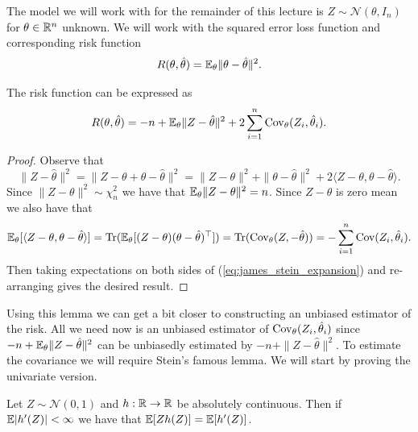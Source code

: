\medskip \noindent 
The model we will work with for the remainder of this lecture is $Z \sim \mathcal{N}(\theta, I_n)$ for $\theta \in \mathbb{R}^n$ unknown. We will work with the squared error loss function and corresponding risk function \[
	R(\theta, \hat \theta) = \mathbb{E}_{\theta} \|\theta - \hat \theta\|^2.
\]

\begin{lemma}
	The risk function can be expressed as \[
		R(\theta, \hat \theta) = -n + \mathbb{E}_\theta \|Z - \hat \theta\|^2 + 2 \sum_{i=1}^n \operatorname{Cov}_\theta(Z_i, \hat \theta_i).
	\]
\end{lemma}

\begin{proof}
Observe that \begin{equation}
	\|Z - \hat \theta\|^2 = \|Z - \theta + \theta - \hat \theta\|^2 = \|Z - \theta\|^2 + \|\theta - \hat \theta\|^2 + 2 \langle Z - \theta, \theta - \hat \theta \rangle. \label{eq:james_stein_expansion}
\end{equation} Since $\|Z - \theta\|^2 \sim \chi^2_n$ we have that $\mathbb{E}_\theta  \|Z - \theta\|^2 = n$. Since $Z - \theta$ is zero mean we also have that \[
	\mathbb{E}_\theta[\langle Z - \theta, \theta - \hat \theta \rangle] = \operatorname{Tr} (\mathbb{E}_\theta[(Z - \theta)(\theta - \hat \theta)^\top ]) = \operatorname{Tr}(\operatorname{Cov}_\theta(Z,  -\hat \theta)) = -\sum_{i=1}^n \operatorname{Cov}(Z_i, \hat \theta_i).
\] Then taking expectations on both sides of (\ref{eq:james_stein_expansion}) and re-arranging gives the desired result.	
\end{proof}

\noindent Using this lemma we can get a bit closer to constructing an unbiased estimator of the risk. All we need now is an unbiased estimator of $\operatorname{Cov}_\theta(Z_i, \hat \theta_i)$ since $-n + \mathbb{E}_\theta \|Z - \hat \theta\|^2$ can be unbiasedly estimated by $-n + \|Z - \hat \theta\|^2$. To estimate the covariance we will require Stein's famous lemma. We will start by proving the univariate version.

\begin{lemma}[Stein]
Let $Z \sim \mathcal{N}(0,1)$ and $h : \mathbb{R} \to \mathbb{R}$ be absolutely continuous. Then if $\mathbb{E}|h'(Z)| < \infty$ we have that $\mathbb{E}[Z h(Z)] = \mathbb{E}[h'(Z)]$.
\end{lemma}

